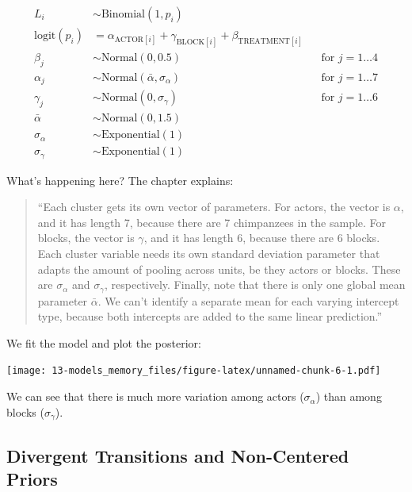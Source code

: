 \documentclass[
]{book}
\begin{document}
\[
\begin{aligned}
L_i &\sim \text{Binomial}(1,p_i) \\
\text{logit}(p_i) &= \alpha_{\text{ACTOR}[i]} + \gamma_{\text{BLOCK}[i]} + \beta_{\text{TREATMENT}[i]} \\
\beta_j &\sim \text{Normal}(0,0.5) && \text{for } j = 1 \dots 4 \\
\alpha_j &\sim \text{Normal}(\bar{\alpha},\sigma_\alpha) && \text{for } j = 1 \dots 7\\
\gamma_j &\sim \text{Normal}(0,\sigma_\gamma) && \text{for } j = 1 \dots 6\\
\bar{\alpha} & \sim \text{Normal}(0,1.5) \\
\sigma_\alpha &\sim \text{Exponential}(1) \\
\sigma_\gamma &\sim \text{Exponential}(1)
\end{aligned}
\]

What's happening here? The chapter explains:

\begin{quote}
``Each cluster gets its own vector of parameters. For actors, the vector is \(\alpha\), and it has length 7, because there are 7 chimpanzees in the sample. For blocks, the vector is \(\gamma\), and it has length 6, because there are 6 blocks. Each cluster variable needs its own standard deviation parameter that adapts the amount of pooling across units, be they actors or blocks. These are \(\sigma_\alpha\) and \(\sigma_\gamma\), respectively. Finally, note that there is only one global mean parameter \(\bar{\alpha}\). We can't identify a separate mean for each varying intercept type, because both intercepts are added to the same linear prediction.''
\end{quote}

We fit the model and plot the posterior:

\texttt{[image: 13-models\_memory\_files/figure-latex/unnamed-chunk-6-1.pdf]}

We can see that there is much more variation among actors (\(\sigma_\alpha\)) than among blocks (\(\sigma_\gamma\)).

\hypertarget{divergent-transitions-and-non-centered-priors}{%
\subsection*{Divergent Transitions and Non-Centered Priors}\label{divergent-transitions-and-non-centered-priors}}
\end{document}
